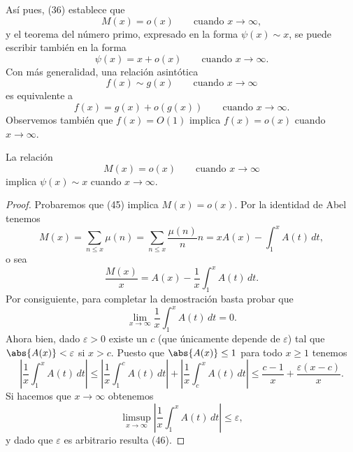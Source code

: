 \documentclass[12pt,a4paper]{book}
\begin{document}
    Así pues, (36) establece que
    \begin{equation*}
        M(x)=o(x)\qquad\text{cuando } x\to\infty,
    \end{equation*}
    y el teorema del número primo, expresado en la forma $\psi(x)\sim x$, se puede
    escribir también en la forma
    \begin{equation*}
        \psi(x)=x+o(x)\qquad\text{cuando } x\to\infty.
    \end{equation*}
    Con más generalidad, una relación asintótica
    \begin{equation*}
        f(x)\sim g(x)\qquad\text{cuando } x\to\infty
    \end{equation*}
    es equivalente a
    \begin{equation*}
        f(x)=g(x)+o(g(x))\qquad\text{cuando } x\to\infty.
    \end{equation*}
    Observemos también que $f(x)=O(1)$ implica $f(x)=o(x)$ cuando $x\to\infty$.

    \begin{teorema}
        La relación
        \begin{equation}
            M(x)=o(x)\qquad\text{cuando } x\to\infty
        \end{equation}
        implica $\psi(x)\sim x$ cuando $x\to\infty$.
    \end{teorema}

    \begin{proof}
        Probaremos que (45) implica $M(x)=o(x)$. Por la identidad de Abel tenemos
        \begin{equation*}
            M(x)=\sum_{n\leq x}\mu(n)=\sum_{n\leq x}\frac{\mu(n)}{n}n=xA(x)-\int_{1}^{x} A(t)\,dt,
        \end{equation*}
        o sea
        \begin{equation*}
            \frac{M(x)}{x}=A(x)-\frac{1}{x}\int_{1}^{x} A(t)\,dt.
        \end{equation*}
        Por consiguiente, para completar la demostración basta probar que
        \begin{equation}
            \lim_{x\to\infty}\frac{1}{x}\int_{1}^{x} A(t)\,dt=0.
        \end{equation}
        Ahora bien, dado $\varepsilon>0$ existe un $c$ (que únicamente depende de
        $\varepsilon$) tal que $\abs{A(x)}<\varepsilon$ si $x>c$. Puesto que
        $\abs{A(x)}\leq1$ para todo $x\geq1$ tenemos
        \begin{equation*}
            \left|\frac{1}{x}\int_{1}^{x} A(t)\,dt\right|\leq\left|\frac{1}{x}\int_{1}^{c} A(t)\,dt\right|
            +\left|\frac{1}{x}\int_{c}^{x} A(t)\,dt\right|\leq\frac{c-1}{x}+\frac{\varepsilon(x-c)}{x}.
        \end{equation*}
        Si hacemos que $x\to\infty$ obtenemos
        \begin{equation*}
            \limsup_{x\to\infty}\left|\frac{1}{x}\int_{1}^{x} A(t)\,dt\right|\leq\varepsilon,
        \end{equation*}
        y dado que $\varepsilon$ es arbitrario resulta (46).
    \end{proof}
\end{document}
